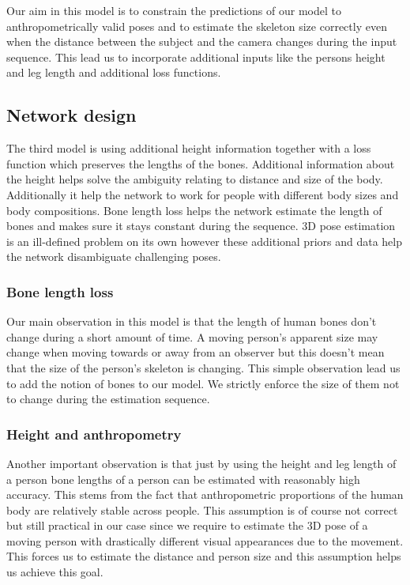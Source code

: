 Our aim in this model is to constrain the predictions of our model to anthropometrically valid poses and to estimate the skeleton size correctly even when the distance between the subject and the camera changes during the input sequence. This lead us to incorporate additional inputs like the persons height and leg length and additional loss functions.

\subsection{Network design}

The third model is using additional height information together with a loss function which preserves the lengths of the bones. Additional information about the height helps solve the ambiguity relating to distance and size of the body. Additionally it help the network to work for people with different body sizes and body compositions. Bone length loss helps the network estimate the length of bones and makes sure it stays constant during the sequence. 3D pose estimation is an ill-defined problem on its own however these additional priors and data help the network disambiguate challenging poses.

\subsubsection{Bone length loss}

Our main observation in this model is that the length of human bones don't change during a short amount of time. A moving person's apparent size may change when moving towards or away from an observer but this doesn't mean that the size of the person's skeleton is changing. This simple observation lead us to add the notion of bones to our model. We strictly enforce the size of them not to change during the estimation sequence.

\subsubsection{Height and anthropometry}

Another important observation is that just by using the height and leg length of a person bone lengths of a person can be estimated with reasonably high accuracy. This stems from the fact that anthropometric proportions of the human body are relatively stable across people. This assumption is of course not correct but still practical in our case since we require to estimate the 3D pose of a moving person with drastically different visual appearances due to the movement. This forces us to estimate the distance and person size and this assumption helps us achieve this goal.

